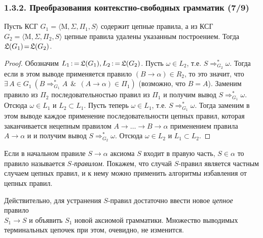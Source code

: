 \documentclass[mathserif,12pt,aspectratio=169]{beamer}
\def\emразделенной{\em разделенной}
\renewcommand{\index}[1]{}
\def\em#1{\it\color{blue}#1}
\def\odmkey#1#2{{\it\color{red} #1}\index{#2}}
\def\Assign{\operatorname{:=}}
\def\E#1#2{\exists\,#1\ \left(#2\right)}
\def\And{\operatorname{\,\&\,}}
\def\Mu{\mathrm{M}}
\begin{document}
\begin{frame}
\frametitle{1.3.2. Преобразования контекстно-свободных грамматик (7/9)}
\begin{theorem}
Пусть КСГ $G_1\!=\!\langle \Mu, \Sigma, \Pi_1, S\rangle$ 
содержит цепные правила, 
а из КСГ \\$G_2\!=\!\langle \Mu, \Sigma, \Pi_2, S\rangle$ 
цепные правила удалены указанным построением. 
Тогда $\frak{L}(G_1)\!=\!\frak{L}(G_2)$.
\end{theorem}

\begin{proof}
Обозначим $L_1\Assign\frak{L}(G_1), L_2\Assign\frak{L}(G_2)$. 
Пусть $\omega\in L_2$, т.е. $S\Rightarrow^*_{G_2} \omega$.
Тогда если в этом выводе применяется правило
$(B\to\alpha)\in R_2$, то это значит, что  
$\E{A\in G_1}{B\Rightarrow_{G_1}^* A \And (A\to\alpha)\in \Pi_1}$ (возможно, что $B=A$). 
Заменим правило из $\Pi_2$ последовательностью 
правил из $\Pi_1$ и получим вывод 
$S\Rightarrow^*_{G_1} \omega$.
Отсюда $\omega\in L_1$ и $L_2\subset L_1$.
Пусть теперь $\omega\in L_1$, т.е. $S\Rightarrow^*_{G_1} \omega$.
Тогда заменим в этом выводе 
каждое применение 
последовательности цепных правил, которая заканчивается 
нецепным правилом
$A\to\dots\to B\to\alpha$ применением
правила 
$A\to\alpha$ и 
 и получим вывод 
$S\Rightarrow^*_{G_2} \omega$.
Отсюда $\omega\in L_2$ и $L_1\subset L_2$.
\end{proof}

\medskip
Если в начальном правиле $S \rightarrow \alpha$ аксиома 
$S$ входит в правую часть, $S\in \alpha$ то правило называется \odmkey{$S$-правилом}{Правило!$S$-правилом}.
Покажем, что случай $S$-правил является частным случаем цепных правил, и к нему можно применить алгоритмы избавления от цепных правил.

Действительно, для устранения $S$-правил 
достаточно ввести новое {\em цепное}
правило \\$S_1\to S$ и объявить $S_1$ 
новой аксиомой грамматики. Множество 
выводимых терминальных цепочек 
при этом, очевидно, не изменится.
\end{frame}
\end{document}
